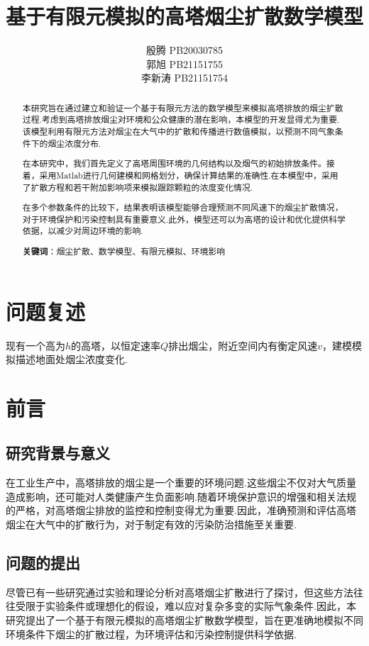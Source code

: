 \documentclass{article}
\title{\bfseries 基于有限元模拟的高塔烟尘扩散数学模型}
\author{殷腾 \quad PB20030785\\郭旭 \quad PB21151755\\李新涛 \quad PB21151754}
\begin{document}
	\maketitle
	\begin{abstract}
		本研究旨在通过建立和验证一个基于有限元方法的数学模型来模拟高塔排放的烟尘扩散过程.考虑到高塔排放烟尘对环境和公众健康的潜在影响，本模型的开发显得尤为重要.该模型利用有限元方法对烟尘在大气中的扩散和传播进行数值模拟，以预测不同气象条件下的烟尘浓度分布.
		
		在本研究中，我们首先定义了高塔周围环境的几何结构以及烟气的初始排放条件。接着，采用Matlab进行几何建模和网格划分，确保计算结果的准确性.在本模型中，采用了扩散方程和若干附加影响项来模拟跟踪颗粒的浓度变化情况.
		
		在多个参数条件的比较下，结果表明该模型能够合理预测不同风速下的烟尘扩散情况，对于环境保护和污染控制具有重要意义.此外，模型还可以为高塔的设计和优化提供科学依据，以减少对周边环境的影响.
		\par \textbf{关键词}：烟尘扩散、数学模型、有限元模拟、环境影响
	\end{abstract}
	\setcounter{section}{-1}
	\clearpage
	\tableofcontents
	\clearpage
	
	\section{问题复述}
	现有一个高为$h$的高塔，以恒定速率$Q$排出烟尘，附近空间内有衡定风速$v$，建模模拟描述地面处烟尘浓度变化.
	
	\section{前言}
	\subsection{研究背景与意义}
	在工业生产中，高塔排放的烟尘是一个重要的环境问题.这些烟尘不仅对大气质量造成影响，还可能对人类健康产生负面影响.随着环境保护意识的增强和相关法规的严格，对高塔烟尘排放的监控和控制变得尤为重要.因此，准确预测和评估高塔烟尘在大气中的扩散行为，对于制定有效的污染防治措施至关重要.
	
	\subsection{问题的提出}
	尽管已有一些研究通过实验和理论分析对高塔烟尘扩散进行了探讨，但这些方法往往受限于实验条件或理想化的假设，难以应对复杂多变的实际气象条件.因此，本研究提出了一个基于有限元模拟的高塔烟尘扩散数学模型，旨在更准确地模拟不同环境条件下烟尘的扩散过程，为环境评估和污染控制提供科学依据.
	
\end{document}
